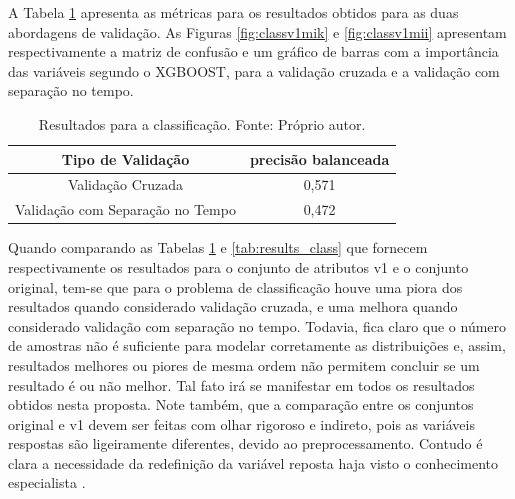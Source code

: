 A Tabela \ref{tab:results_v1_class} apresenta as métricas para os resultados obtidos para as duas abordagens de validação. As Figuras \ref{fig:classv1mik} e \ref{fig:classv1mii} apresentam respectivamente a matriz de confusão e um gráfico de barras com a importância das variáveis segundo o XGBOOST, para a validação cruzada e a validação com separação no tempo.

\begin{table}[h]
\begin{center}
\begin{tabular}{|c|c|}
\hline
Tipo de Validação & precisão balanceada   \\ \hline
Validação Cruzada                   & 0,571    \\ \hline
Validação com Separação no Tempo    & 0,472     \\ \hline
\end{tabular}
\end{center}
\vspace{12pt}
\caption{Resultados para a classificação. Fonte: Próprio autor.}
\label{tab:results_v1_class}
\end{table}

Quando comparando as Tabelas \ref{tab:results_v1_class} e \ref{tab:results_class} que fornecem respectivamente os resultados para o conjunto de atributos v1 e o conjunto original, tem-se que para o problema de classificação houve uma piora dos resultados quando considerado validação cruzada, e uma melhora quando considerado validação com separação no tempo. Todavia, fica claro que o número de amostras não é suficiente para modelar corretamente as distribuições e, assim, resultados melhores ou piores de mesma ordem não permitem concluir se um resultado é ou não melhor. Tal fato irá se manifestar em todos os resultados obtidos nesta proposta. Note também, que a comparação entre os conjuntos original e v1 devem ser feitas com olhar rigoroso e indireto, pois as variáveis respostas são ligeiramente diferentes, devido ao preprocessamento. Contudo é clara a necessidade da redefinição da variável reposta haja visto o conhecimento especialista \cite{MUELLA:2008}.

